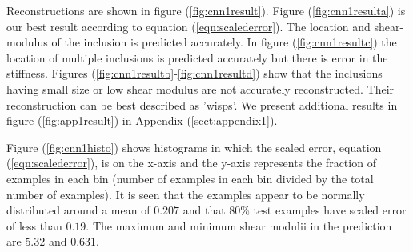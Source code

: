 \documentclass[12pt]{article}
\begin{document}
Reconstructions are shown in figure (\ref{fig:cnn1result}). Figure (\ref{fig:cnn1resulta}) is our best result according to equation (\ref{eqn:scalederror}). The location and shear-modulus of the inclusion is predicted accurately. In figure (\ref{fig:cnn1resultc}) the location of multiple inclusions is predicted accurately but there is error in the stiffness. Figures (\ref{fig:cnn1resultb}-\ref{fig:cnn1resultd}) show that the inclusions having small size or low shear modulus are not accurately reconstructed. Their reconstruction can be best described as 'wisps'. We present additional results in figure (\ref{fig:app1result}) in Appendix (\ref{sect:appendix1}).

Figure (\ref{fig:cnn1histo}) shows histograms in which the scaled error, equation (\ref{eqn:scalederror}), is on the x-axis and the y-axis represents the fraction of examples in each bin (number of examples in each bin divided by the total number of examples). It is seen that the examples appear to be normally distributed around a mean of ${0.207}$ and that $80\%$ test examples have scaled error of less than $0.19$. The maximum and minimum shear modulii in the prediction are $5.32$ and $0.631$. 
\end{document}
